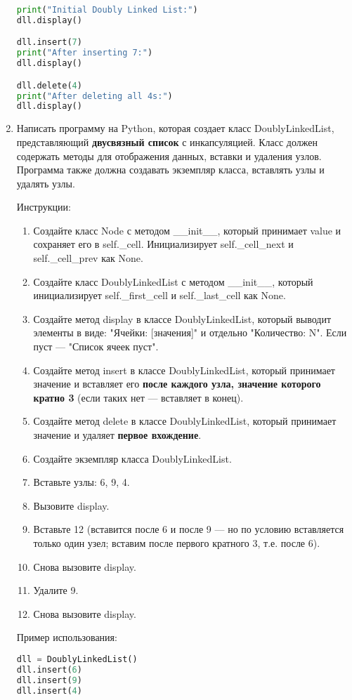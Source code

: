 \begin{enumerate}
\begin{lstlisting}[language=Python]
print("Initial Doubly Linked List:")
dll.display()

dll.insert(7)
print("After inserting 7:")
dll.display()

dll.delete(4)
print("After deleting all 4s:")
dll.display()
\end{lstlisting}

\item Написать программу на Python, которая создает класс DoublyLinkedList, представляющий \textbf{двусвязный список} с инкапсуляцией. Класс должен содержать методы для отображения данных, вставки и удаления узлов. Программа также должна создавать экземпляр класса, вставлять узлы и удалять узлы.

Инструкции:
\begin{enumerate}
    \item Создайте класс Node с методом \_\_init\_\_, который принимает value и сохраняет его в self.\_cell. Инициализирует self.\_cell\_next и self.\_cell\_prev как None.
    \item Создайте класс DoublyLinkedList с методом \_\_init\_\_, который инициализирует self.\_first\_cell и self.\_last\_cell как None.
    \item Создайте метод display в классе DoublyLinkedList, который выводит элементы в виде: "Ячейки: [значения]" и отдельно "Количество: N". Если пуст — "Список ячеек пуст".
    \item Создайте метод insert в классе DoublyLinkedList, который принимает значение и вставляет его \textbf{после каждого узла, значение которого кратно 3} (если таких нет — вставляет в конец).
    \item Создайте метод delete в классе DoublyLinkedList, который принимает значение и удаляет \textbf{первое вхождение}.
    \item Создайте экземпляр класса DoublyLinkedList.
    \item Вставьте узлы: 6, 9, 4.
    \item Вызовите display.
    \item Вставьте 12 (вставится после 6 и после 9 — но по условию вставляется только один узел; вставим после первого кратного 3, т.е. после 6).
    \item Снова вызовите display.
    \item Удалите 9.
    \item Снова вызовите display.
\end{enumerate}

Пример использования:
\begin{lstlisting}[language=Python]
dll = DoublyLinkedList()
dll.insert(6)
dll.insert(9)
dll.insert(4)


\end{lstlisting}
\end{enumerate}
